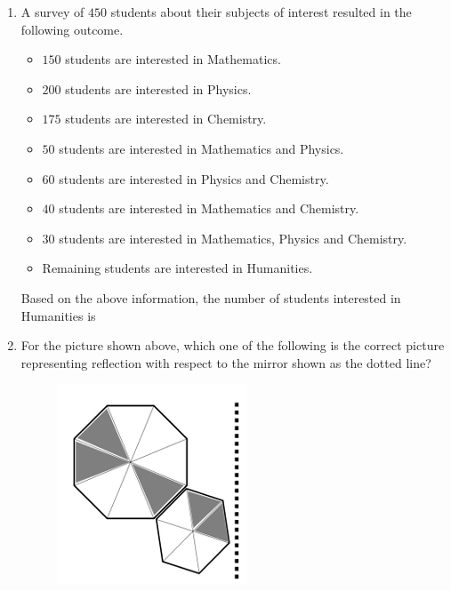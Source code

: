 \documentclass[journal,12pt,onecolumn]{IEEEtran}
\theoremstyle{remark}
\begin{document}
\begin{enumerate}
    \item A survey of $450$ students about their subjects of interest resulted in the following outcome.
    \begin{itemize}
        \item $150$ students are interested in Mathematics.
        \item $200$ students are interested in Physics.
        \item $175$ students are interested in Chemistry.
        \item $50$ students are interested in Mathematics and Physics.
        \item $60$ students are interested in Physics and Chemistry.
        \item $40$ students are interested in Mathematics and Chemistry.
        \item $30$ students are interested in Mathematics, Physics and Chemistry.
        \item Remaining students are interested in Humanities.
    \end{itemize}
    Based on the above information, the number of students interested in Humanities is

    \hfill{}
    \begin{enumerate}
    \end{enumerate}

    \item For the picture shown above, which one of the following is the correct picture representing reflection with respect to the mirror shown as the dotted line?
    \begin{figure}[H]
        \centering
        \includegraphics[width=0.2\columnwidth]{fig1.png}
        \caption*{}
        \label{fig:q5}
    \end{figure}


\end{enumerate}
\end{document}
